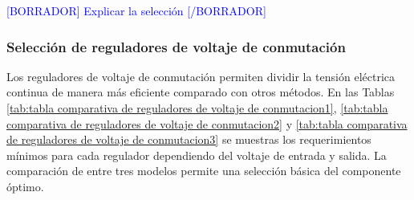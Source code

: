 \textcolor{blue}{[BORRADOR] Explicar la selección [/BORRADOR]}


\subsubsection{Selección de reguladores de voltaje de conmutación}

Los reguladores de voltaje de conmutación permiten dividir la tensión eléctrica continua de manera más eficiente comparado con otros métodos. En las Tablas \ref{tab:tabla comparativa de reguladores de voltaje de conmutacion1}, \ref{tab:tabla comparativa de reguladores de voltaje de conmutacion2} y \ref{tab:tabla comparativa de reguladores de voltaje de conmutacion3} se muestras los requerimientos mínimos para cada regulador dependiendo del voltaje de entrada y salida. La comparación de entre tres modelos permite una selección básica del componente óptimo.



